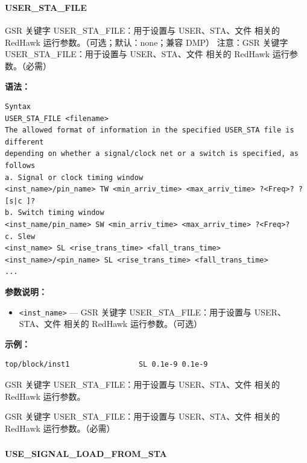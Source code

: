 \subsubsection{}
\paragraph*{USER_STA_FILE}

GSR 关键字 USER_STA_FILE：用于设置与 USER、STA、文件 相关的 RedHawk 运行参数。（可选；默认：none；兼容 DMP） 注意：GSR 关键字 USER_STA_FILE：用于设置与 USER、STA、文件 相关的 RedHawk 运行参数。（必需）

\textbf{语法：}
\begin{lstlisting}
Syntax
USER_STA_FILE <filename>
The allowed format of information in the specified USER_STA file is different
depending on whether a signal/clock net or a switch is specified, as follows
a. Signal or clock timing window
<inst_name>/pin_name> TW <min_arriv_time> <max_arriv_time> ?<Freq>? ?[s|c ]?
b. Switch timing window
<inst_name/pin_name> SW <min_arriv_time> <max_arriv_time> ?<Freq>?
c. Slew
<inst_name> SL <rise_trans_time> <fall_trans_time>
<inst_name>/<pin_name> SL <rise_trans_time> <fall_trans_time>
...
\end{lstlisting}

\textbf{参数说明：}
\begin{itemize}
\item \texttt{<inst\_name>} — GSR 关键字 USER\_STA\_FILE：用于设置与 USER、STA、文件 相关的 RedHawk 运行参数。（可选）
\end{itemize}

\textbf{示例：}
\begin{lstlisting}
top/block/inst1                SL 0.1e-9 0.1e-9
\end{lstlisting}

\begin{noteBox}
GSR 关键字 USER\_STA\_FILE：用于设置与 USER、STA、文件 相关的 RedHawk 运行参数。
\end{noteBox}

\begin{noteBox}
GSR 关键字 USER\_STA\_FILE：用于设置与 USER、STA、文件 相关的 RedHawk 运行参数。（必需）
\end{noteBox}

\subsubsection{}
\paragraph*{USE_SIGNAL_LOAD_FROM_STA}

